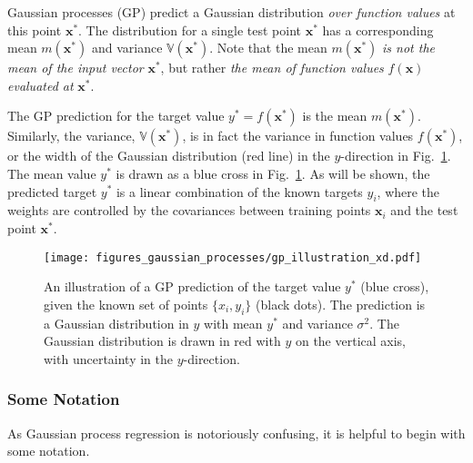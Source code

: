\documentclass[twoside,english]{uiofysmaster}
\begin{document}
{{Gaussian processes (GP) predict a Gaussian distribution \textit{over function values} at this point $\textbf{x}^*$. The distribution for a single test point $\textbf{x}^*$ has a corresponding mean $m(\textbf{x}^*)$ and variance $\mathbb{V}(\textbf{x}^*)$. Note that the mean $m(\textbf{x}^*)$ \textit{is not the mean of the input vector} $\textbf{x}^*$, but rather \textit{the mean of function values} $f(\textbf{x})$ \textit{evaluated at} $\textbf{x}^*$. 

The GP prediction for the target value $y^*=f(\textbf{x}^*)$ is the mean $m(\textbf{x}^*)$. Similarly, the variance, $\mathbb{V}(\textbf{x}^*)$, is in fact the variance in function values $f(\textbf{x}^*)$, or the width of the Gaussian distribution (red line) in the $y$-direction in Fig.~\ref{Fig:: gaussian process : GP illustration}. The mean value $y^*$ is drawn as a blue cross in Fig.~\ref{Fig:: gaussian process : GP illustration}. As will be shown, the predicted target $y^*$ is a linear combination of the known targets $y_i$, where the weights are controlled by the covariances between training points $\textbf{x}_i$ and the test point $\textbf{x}^*$.  


\begin{figure}
\centering
\texttt{[image: figures\_gaussian\_processes/gp\_illustration\_xd.pdf]}
\caption[An illustration of Gaussian process regression]{An illustration of a GP prediction of the target value $y^*$ (blue cross), given the known set of points $\{x_i, y_i\}$ (black dots). The prediction is a Gaussian distribution in $y$ with mean $y^*$ and variance $\sigma^2$. The Gaussian distribution is drawn in red with $y$ on the vertical axis, with uncertainty in the $y$-direction.}
\label{Fig:: gaussian process : GP illustration}
\end{figure}

\subsubsection{Some Notation}

As Gaussian process regression is notoriously confusing, it is helpful to begin with some notation. 

}}
\end{document}
